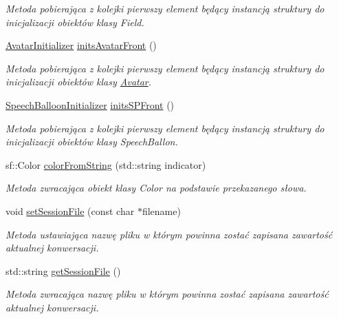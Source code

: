 \begin{DoxyCompactItemize}
\begin{DoxyCompactList}\small\item\em Metoda pobierająca z kolejki pierwszy element będący instancją struktury do inicjalizacji obiektów klasy Field. \end{DoxyCompactList}\item 
\mbox{\hyperlink{struct_avatar_initializer}{Avatar\+Initializer}} \mbox{\hyperlink{class_settings_container_afa7c4b8ddb91e7ad4cf055d48bd70d8b}{inits\+Avatar\+Front}} ()
\begin{DoxyCompactList}\small\item\em Metoda pobierająca z kolejki pierwszy element będący instancją struktury do inicjalizacji obiektów klasy \mbox{\hyperlink{class_avatar}{Avatar}}. \end{DoxyCompactList}\item 
\mbox{\hyperlink{struct_speech_balloon_initializer}{Speech\+Balloon\+Initializer}} \mbox{\hyperlink{class_settings_container_ae0a7d9865c607f08cbdadbdc69d0707c}{inits\+S\+P\+Front}} ()
\begin{DoxyCompactList}\small\item\em Metoda pobierająca z kolejki pierwszy element będący instancją struktury do inicjalizacji obiektów klasy Speech\+Ballon. \end{DoxyCompactList}\item 
sf\+::\+Color \mbox{\hyperlink{class_settings_container_abec07eef08fbce08cee62879f90671d8}{color\+From\+String}} (std\+::string indicator)
\begin{DoxyCompactList}\small\item\em Metoda zwracająca obiekt klasy Color na podstawie przekazanego słowa. \end{DoxyCompactList}\item 
void \mbox{\hyperlink{class_settings_container_ad8aa4d6394970991b60aedfa536519a6}{set\+Session\+File}} (const char $\ast$filename)
\begin{DoxyCompactList}\small\item\em Metoda ustawiająca nazwę pliku w którym powinna zostać zapisana zawartość aktualnej konwersacji. \end{DoxyCompactList}\item 
std\+::string \mbox{\hyperlink{class_settings_container_a3749f9771ddd01a1bff093fe84ef5b65}{get\+Session\+File}} ()
\begin{DoxyCompactList}\small\item\em Metoda zwracająca nazwę pliku w którym powinna zostać zapisana zawartość aktualnej konwersacji. \end{DoxyCompactList}\item 

\end{DoxyCompactItemize}
